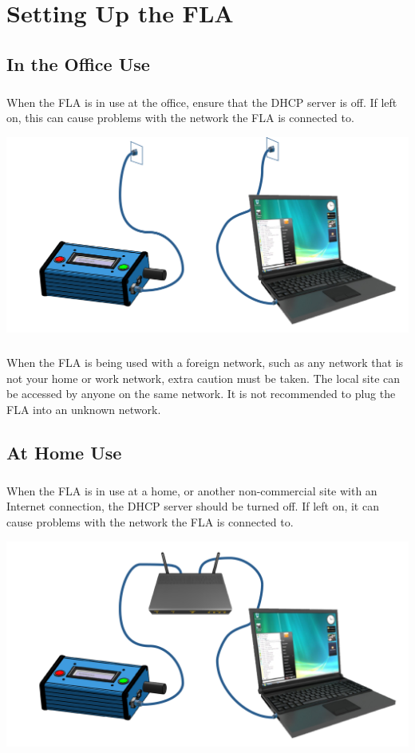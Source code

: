 \documentclass[11pt, oneside]{book}
\begin{document}
\chapter{Setting Up the FLA}
\section{In the Office Use}\label{sec:setting_fla_in_office}
\paragraph{  }
When the FLA is in use at the office, ensure that the DHCP server is off. If left on, this can cause problems with the network the FLA is connected to.
\begin{center}
\includegraphics[width=.9\linewidth]{../media/graphics/fla_in_office}
\end{center}
\paragraph{  }
When the FLA is being used with a foreign network, such as any network that is not your home or work network, extra caution must be taken. The local site can be accessed by anyone on the same network.
It is not recommended to plug the FLA into an unknown network.
\section{At Home Use}\label{sec:setting_fla_at_home}
\paragraph{  }
When the FLA is in use at a home, or another non-commercial site with an Internet connection, the DHCP server should be turned off. If left on, it can cause problems with the network the FLA is connected to.
\begin{center}
\includegraphics[width=.9\linewidth]{../media/graphics/fla_at_home}
\end{center}
\end{document}
